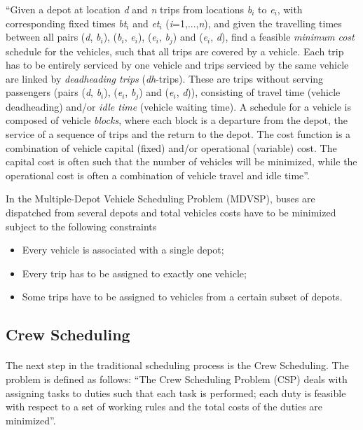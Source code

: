 \documentclass[12pt, oneside]{report}
\begin{document}
“Given a depot at location \textit{d} and \textit{n} trips from locations \textit{b}$_i$ to \textit{e}$_i$, with corresponding fixed times \textit{bt}$_i$ and \textit{et}$_i$ (\textit{i}=1,...,\textit{n}),  and  given  the  travelling  times  between  all  pairs (\textit{d}, \textit{b}$_i$), (\textit{b}$_i$, \textit{e}$_i$), (\textit{e}$_i$, \textit{b}$_j$) and (\textit{e}$_i$, \textit{d}), find a feasible \textit{minimum cost} schedule for the vehicles, such that all trips are covered by a vehicle. Each trip has to be entirely serviced by one vehicle and trips serviced by the same vehicle are linked by \textit{deadheading trips} (\textit{dh}-trips).  These are trips without serving passengers (pairs (\textit{d}, \textit{b}$_i$), (\textit{e}$_i$, \textit{b}$_j$) and (\textit{e}$_i$, \textit{d})), consisting of travel time (vehicle deadheading) and/or \textit{idle time} (vehicle waiting time). A schedule for a vehicle is composed of vehicle \textit{blocks}, where each block is a departure from the depot, the service of a sequence of trips and the return to the depot. The cost function is a combination of vehicle capital (fixed) and/or operational (variable) cost. The capital cost is often such that the number of vehicles will be minimized, while the operational cost is often a combination of vehicle travel and idle time”.

In the Multiple-Depot Vehicle Scheduling Problem (MDVSP), buses are dispatched from several depots and total vehicles costs have to be minimized subject to the following constraints \citep{Huisman2004}

\begin {itemize}
\item Every vehicle is associated with a single depot; 
\item Every trip has to be assigned to exactly one vehicle; 
\item Some trips have to be assigned to vehicles from a certain subset of depots.
\end {itemize}

\subsection {Crew Scheduling}

\paragraph{ } The next step in the traditional scheduling process is the Crew Scheduling.  The problem is defined as follows: “The Crew Scheduling Problem (CSP) deals with assigning tasks to duties such that each task is performed; each duty is feasible with respect to a set of working rules and the total costs of the duties are minimized”. 
\end{document}
